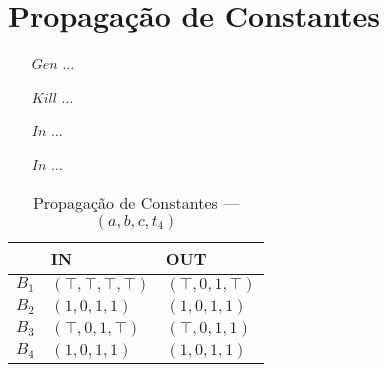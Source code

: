 \section{Propaga\c{c}\~ao de Constantes}

\begin{itemize}
  \item[$Gen$] ...
  \item[$Kill$] ...
  \item[$In$] ...
  \item[$In$] ...
\end{itemize}

\begin{table}[ht]
\centering
\begin{tabular}{l|l|l}
	& IN & OUT\\
\hline
$B_{1}$ &  $(\top,\top,\top,\top)$ & $(\top,0,1,\top)$\\
$B_{2}$ &  $(1,0,1,1)$ & $(1,0,1,1)$\\
$B_{3}$ &  $(\top,0,1,\top)$ & $(\top,0,1,1)$\\
$B_{4}$ &  $(1,0,1,1)$ & $(1,0,1,1)$\\
\end{tabular}
\caption{Propaga\c{c}\~ao de Constantes --- $(a, b, c, t_{4})$}
\end{table}

